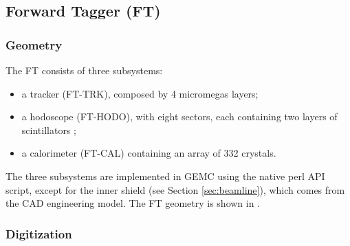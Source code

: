 \subsection{Forward Tagger (FT)}


\subsubsection{Geometry}

The FT consists of three subsystems:

\begin{itemize}
	\item a tracker (FT-TRK), composed by 4 micromegas layers;
	\item a hodoscope (FT-HODO), with eight sectors, each containing two layers of scintillators ;
 	\item a calorimeter (FT-CAL) containing an array of 332 crystals.
\end{itemize}

The three subsystems are implemented in GEMC using the native perl API script, except for the inner shield (see Section \ref{sec:beamline}),
which comes from the CAD engineering model.
The FT geometry is shown in .

\subsubsection{Digitization}

